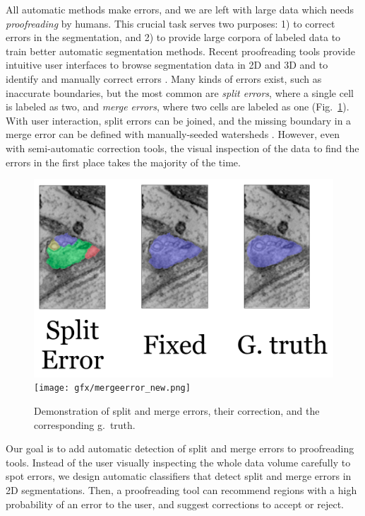 All automatic methods make errors, and we are left with large data which needs \emph{proofreading} by humans. This crucial task serves two purposes: 1) to correct errors in the segmentation, and 2) to provide large corpora of labeled data to train better automatic segmentation methods. Recent proofreading tools provide intuitive user interfaces to browse segmentation data in 2D and 3D and to identify and manually correct errors \cite{markus_proofreading,raveler,mojo2,haehn_dojo_2014}. Many kinds of errors exist, such as inaccurate boundaries, but the most common are \emph{split errors}, where a single cell is labeled as two, and \emph{merge errors}, where two cells are labeled as one (Fig.~\ref{fig:merge_error}). With user interaction, split errors can be joined, and the missing boundary in a merge error can be defined with manually-seeded watersheds \cite{haehn_dojo_2014}. However, even with semi-automatic correction tools, the visual inspection of the data to find the errors in the first place takes the majority of the time.

\begin{figure}[t]
\centering
\includegraphics[scale=.125]{gfx/spliterror.png}
\qquad
\texttt{[image: gfx/mergeerror\_new.png]}
\caption{Demonstration of split and merge errors, their correction, and the corresponding g.~truth.}
\label{fig:merge_error}
\end{figure}

Our goal is to add automatic detection of split and merge errors to proofreading tools. Instead of the user visually inspecting the whole data volume carefully to spot errors, we design automatic classifiers that detect split and merge errors in 2D segmentations. Then, a proofreading tool can recommend regions with a high probability of an error to the user, and suggest corrections to accept or reject.

